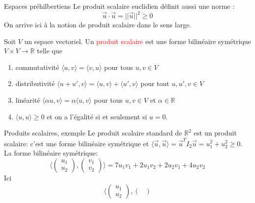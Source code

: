         \begin{parag}{Espaces préhilbertiens}
            Le produit scalaire euclidien définit aussi une norme :
            \[\vec{u}\cdot \vec{u} = ||\vec{u}||^2 \geq 0\]
            On arrive ici à la notion de produit scalaire dans le sens large.
            \begin{definition}
                Soit $V$ un espace vectoriel. Un \textcolor{red}{produit scalaire} est une forme bilinéaire symétrique $V \times V \to \mathbb{R}$ telle que 
                \begin{enumerate}
                    \item commutativité $\langle u, v \rangle = \langle v, u\rangle$ pour tous $u, v \in V$
                    \item distributivité $\langle u + u', v\rangle = \langle u, v \rangle + \langle u', v \rangle$ pour tout $u, u', v \in V$
                    \item linéarité $\langle \alpha u, v \rangle = \alpha \langle u, v \rangle$ pour tous $u, v \in V$ et $\alpha \in \mathbb{R}$
                    \item  $\langle u, u \rangle \geq 0$ et on a l'égalité si et seulement si $u = 0$.
                \end{enumerate}
            \end{definition}
            \begin{subparag}{Produits scalaires, exemple}
                Le produit scalaire standard de $\mathbb{R}^2$ est un produit scalaire: c'est une forme bilinéaire symétrique et $\langle \vec{u}, \vec{u}\rangle = \vec{u}^TI_2\vec{u} = u_1^2 + u_2^2 \geq 0$.
                \\
                La forme bilinéaire symétrique:
                \[\langle\begin{pmatrix}
                    u_1 \\ u_2
                \end{pmatrix}, \begin{pmatrix}
                    v_1 \\ v_2
                \end{pmatrix}\rangle = 7u_1v_1 + 2u_1v_2 + 2u_2v_1 + 4u_2v_2\]
                Ici
                \begin{align*}
                \langle\begin{pmatrix}
                    u_1 \\ u_2
                \end{pmatrix}, \begin{pmatrix}

\end{pmatrix}
\end{align*}
\end{subparag}
\end{parag}
